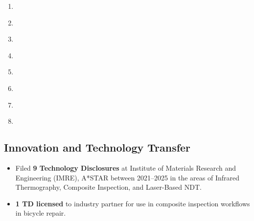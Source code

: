 \documentclass{my_cv}%
\begin{document}
\begin{enumerate}
\item \label{C30}  
\item \label{C31}  
\item \label{C32}  
\item \label{C33}  
\item \label{C34}  
\item \label{C35}  
\item \label{C36}  
\item \label{C37}  
\end{enumerate}
\subsection{\faLightbulbO \hspace{0.5em}\bfseries Innovation and Technology Transfer}

\begin{itemize}
\setlength\itemsep{-0.1em}
  \item Filed \textbf{9 Technology Disclosures} at Institute of Materials Research and Engineering (IMRE), A*STAR between 2021–2025 in the areas of Infrared Thermography, Composite Inspection, and Laser-Based NDT.
  \item \textbf{1 TD licensed} to industry partner for use in  composite inspection workflows in bicycle repair.
\end{itemize}
\end{document}
